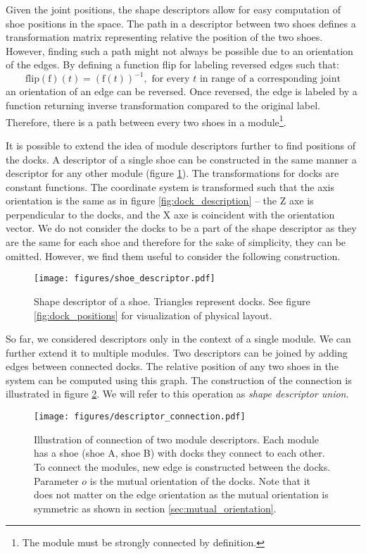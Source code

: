 Given the joint positions, the shape descriptors allow for easy computation of
shoe positions in the space. The path in a descriptor between two shoes defines
a transformation matrix representing relative the position of the two shoes.
However, finding such a path might not always be possible due to an orientation
of the edges. By defining a function flip for labeling reversed edges such that:
\[\text{flip}(\text{f})(t) = (\text{f}(t))^{-1}, \text{ for every } t \text{ in
range of a corresponding joint}\] an orientation of an edge can be reversed.
Once reversed, the edge is labeled by a function returning inverse
transformation compared to the original label. Therefore, there is a path
between every two shoes in a module\footnote{The module must be strongly
connected by definition.}.

It is possible to extend the idea of module descriptors further to find
positions of the docks. A descriptor of a single shoe can be constructed in the
same manner a descriptor for any other module (figure
\ref{fig:shoe_descriptor}). The transformations for docks are constant
functions. The coordinate system is transformed such that the axis orientation
is the same as in figure \ref{fig:dock_description} -- the Z axe is
perpendicular to the docks, and the X axe is coincident with the orientation
vector. We do not consider the docks to be a part of the shape descriptor as
they are the same for each shoe and therefore for the sake of simplicity, they
can be omitted. However, we find them useful to consider the following
construction.

\begin{figure}[t]
    \centering
    \texttt{[image: figures/shoe\_descriptor.pdf]}
    \caption{Shape descriptor of a shoe. Triangles represent docks. See figure
    \ref{fig:dock_positions} for visualization of physical layout.}
    \label{fig:shoe_descriptor}
\end{figure}

So far, we considered descriptors only in the context of a single module. We can
further extend it to multiple modules. Two descriptors can be joined by adding
edges between connected docks. The relative position of any two shoes in the
system can be computed using this graph. The construction of the connection is
illustrated in figure \ref{fig:connection_descriptor}. We will refer to this
operation as \emph{shape descriptor union}.

\begin{figure}[t]
    \centering
    \texttt{[image: figures/descriptor\_connection.pdf]}
    \caption{Illustration of connection of two module descriptors. Each module
    has a shoe (shoe A, shoe B) with docks they connect to each other. To
    connect the modules, new edge is constructed between the docks. Parameter
    $o$ is the mutual orientation of the docks. Note that it does not matter on
    the edge orientation as the mutual orientation is symmetric as shown in
    section \ref{sec:mutual_orientation}. }
    \label{fig:connection_descriptor}
\end{figure}

